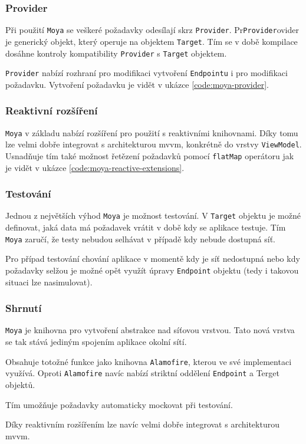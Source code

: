 \subsubsection*{Provider}

Při použití \texttt{Moya} se veškeré požadavky odesílají skrz \texttt{Provider}.
Pr\texttt{Provider}ovider je generický objekt, který operuje na objektem \texttt{Target}.
Tím se v době kompilace dosáhne kontroly kompatibility \texttt{Provider} s \texttt{Target} objektem.

\texttt{Provider} nabízí rozhraní pro modifikaci vytvoření \texttt{Endpointu} i pro modifikaci požadavku.
Vytvoření požadavku je vidět v ukázce \ref{code:moya-provider}.


\subsubsection*{Reaktivní rozšíření}

\texttt{Moya} v základu nabízí rozšíření pro použití s reaktivními knihovnami.
Díky tomu lze velmi dobře integrovat s architekturou \acrshort{mvvm}, konkrétně do vrstvy \texttt{ViewModel}.
Usnadňuje tím také možnost řetězení požadavků pomocí \texttt{flatMap} operátoru jak je vidět v ukázce \ref{code:moya-reactive-extensions}.


\subsubsection*{Testování}

Jednou z největších výhod \texttt{Moya} je možnost testování.
V \texttt{Target} objektu je možné definovat, jaká data má požadavek vrátit v době kdy se aplikace testuje.
Tím \texttt{Moya} zaručí, že testy nebudou selhávat v případě kdy nebude dostupná síť.

Pro případ testování chování aplikace v momentě kdy je síť nedostupná nebo kdy požadavky selžou je možné opět využít úpravy \texttt{Endpoint} objektu (tedy i takovou situaci lze nasimulovat).

\subsubsection*{Shrnutí}

\texttt{Moya} je knihovna pro vytvoření abstrakce nad síťovou vrstvou.
Tato nová vrstva se tak stává jediným spojením aplikace okolní sítí.

Obsahuje totožné funkce jako knihovna \texttt{Alamofire}, kterou ve své implementaci využívá.
Oproti \texttt{Alamofire} navíc nabízí striktní oddělení \texttt{Endpoint} a Terget objektů.

Tím umožňuje požadavky automaticky mockovat při testování.

Díky reaktivním rozšířením lze navíc velmi dobře integrovat s architekturou \acrshort{mvvm}.